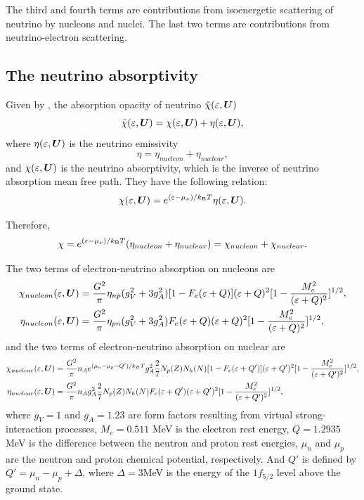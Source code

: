 \documentclass[10pt,preprint]{aastex}
\begin{document}
The third and fourth terms are contributions from isoenergetic scattering of neutrino by nucleons and nuclei. The last two terms are contributions from neutrino-electron scattering. 

\subsection{The neutrino absorptivity}

Given by \citet{bruenn_1985}, the absorption opacity of neutrino $\tilde{\chi}(\varepsilon,\boldsymbol{U})$ 
\begin{equation}
\tilde{\chi}(\varepsilon,\boldsymbol{U}) = \chi(\varepsilon,\boldsymbol{U}) + \eta(\varepsilon,\boldsymbol{U}), 
\end{equation}
where $\eta(\varepsilon,\boldsymbol{U}) $ is the neutrino emissivity
\begin{equation}
\eta = \eta_{nucleon} + \eta_{nuclear},
\end{equation}  
and $ \chi(\varepsilon,\boldsymbol{U})$ is the neutrino absorptivity, which is the inverse of neutrino absorption mean free path.
They have the following relation:
\begin{equation}
\chi(\varepsilon,\boldsymbol{U}) = e^{(\varepsilon-\mu_{\nu})/k_{\mbox{\tiny B}}T} \eta(\varepsilon,\boldsymbol{U}). 
\end{equation}

Therefore,
\begin{equation}
\chi = e^{(\varepsilon-\mu_{\nu})/k_{\mbox{\tiny B}}T} (\eta_{nucleon} + \eta_{nuclear} ) = \chi_{nucleon} + \chi_{nuclear}.
\end{equation}

The two terms of electron-neutrino absorption on nucleons are
\begin{align}
\chi_{nucleon}(\varepsilon,\boldsymbol{U}) & = \dfrac{G^2}{\pi} \eta_{np}(g_V^2+3g_A^2)[1-F_e(\varepsilon+Q)](\varepsilon+Q)^2[1-\dfrac{M^2_e}{(\varepsilon+Q)^2}]^{1/2} \label{eq:nucleonabsorption} ,\\
\eta_{nucleon}(\varepsilon,\boldsymbol{U}) &= \dfrac{G^2}{\pi}\eta_{pn}(g_V^2+3g_A^2)F_e(\varepsilon+Q)(\varepsilon+Q)^2[1-\dfrac{M^2_e}{(\varepsilon+Q)^2}]^{1/2} \label{eq:nucleonemissivity} ,
\end{align}
and the two terms of electron-neutrino absorption on nuclear are
\begin{align}
\chi_{nuclear}(\varepsilon,\boldsymbol{U}) & = \dfrac{G^2}{\pi} n_A e^{(\mu_n -\mu_p -Q')/k_B T} g^2_A \dfrac{2}{7} N_p(Z) N_h(N)[1-F_e(\varepsilon+Q')](\varepsilon+Q')^2[1-\dfrac{M_e^2}{(\varepsilon+Q')^2}]^{1/2} \label{eq:nuclearabsorption} ,\\
\eta_{nuclear}(\varepsilon,\boldsymbol{U}) &=\dfrac{G^2}{\pi} n_A g^2_A \dfrac{2}{7} N_p(Z) N_h(N)F_e(\varepsilon+Q')(\varepsilon+Q')^2[1-\dfrac{M_e^2}{(\varepsilon+Q')^2}]^{1/2} \label{eq:nuclearemissivity},
\end{align} 
where $g_V = 1$ and $g_A =1.23$ are form factors resulting from virtual strong-interaction processes, $M_e = 0.511$ MeV is the electron rest energy, $Q = 1.2935$ MeV is the difference between the neutron and proton rest energies, $\mu_n$ and $\mu_p$ are the neutron and proton chemical potential, respectively. And $Q'$ is defined by $Q' = \mu_n -\mu_p + \Delta$, where $\Delta=3$MeV is the energy of the $1f_{5/2}$ level above the ground state.  
\end{document}
